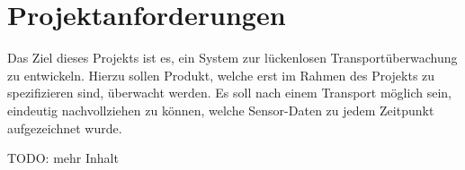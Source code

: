 \section{Projektanforderungen}
\label{sec:requirements}

Das Ziel dieses Projekts ist es, ein System zur lückenlosen Transportüberwachung
	zu entwickeln. Hierzu sollen Produkt, welche erst im Rahmen des Projekts zu
	spezifizieren sind, überwacht werden. Es soll nach einem Transport möglich
	sein, eindeutig nachvollziehen zu können, welche Sensor-Daten zu jedem
	Zeitpunkt aufgezeichnet wurde.
	
TODO: mehr Inhalt